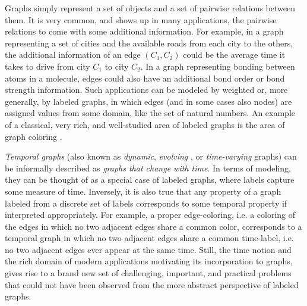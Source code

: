 \documentclass[oribibl, 11pt]{llncs}
\begin{document}
Graphs simply represent a set of objects and a set of pairwise relations between them. It is very common, and shows up in many applications, the pairwise relations to come with some additional information. For example, in a graph representing a set of cities and the available roads from each city to the others, the additional information of an edge $(C_1,C_2)$ could be the average time it takes to drive from city $C_1$ to city $C_2$. In a graph representing bonding between atoms in a molecule, edges could also have an additional bond order or bond strength information. Such applications can be modeled by weighted or, more generally, by labeled graphs, in which edges (and in some cases also nodes) are assigned values from some domain, like the set of natural numbers. An example of a classical, very rich, and well-studied area of labeled graphs is the area of graph coloring \cite{MR02}.

\emph{Temporal graphs} (also known as \emph{dynamic}, \emph{evolving} \cite{Fe04}, or \emph{time-varying} \cite{FMS09,CFQS12} graphs) can be informally described as \emph{graphs that change with time}. In terms of modeling, they can be thought of as a special case of labeled graphs, where labels capture some measure of time. Inversely, it is also true that any property of a graph labeled from a discrete set of labels corresponds to some temporal property if interpreted appropriately. For example, a proper edge-coloring, i.e. a coloring of the edges in which no two adjacent edges share a common color, corresponds to a temporal graph in which no two adjacent edges share a common time-label, i.e. no two adjacent edges ever appear at the same time. Still, the time notion and the rich domain of modern applications motivating its incorporation to graphs, gives rise to a brand new set of challenging, important, and practical problems that could not have been observed from the more abstract perspective of labeled graphs.
\end{document}
